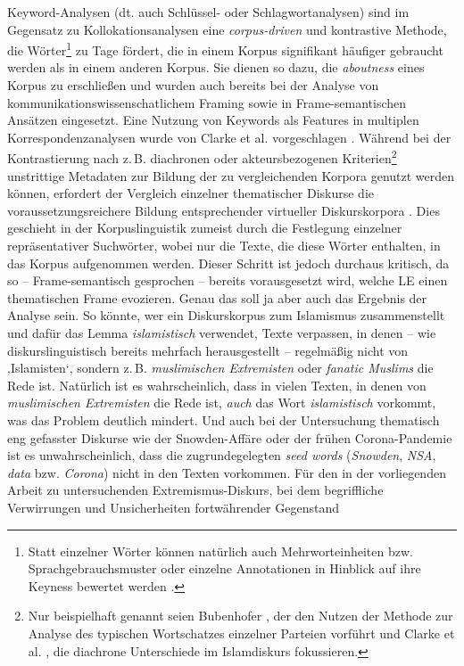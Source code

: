 Keyword-Analysen (dt. auch Schlüssel- oder Schlagwortanalysen) sind im Gegensatz zu Kollokationsanalysen eine \emph{corpus-driven} und kontrastive Methode, die Wörter\footnote{Statt einzelner Wörter können natürlich auch Mehrworteinheiten bzw. Sprachgebrauchsmuster oder einzelne Annotationen in Hinblick auf ihre Keyness bewertet werden \autocite{bubenhoferSprachgebrauchsmusterKorpuslinguistikAls2009, bubenhofer4KollokationenNGramme2017}.} zu Tage fördert, die in einem Korpus signifikant häufiger gebraucht werden als in einem anderen Korpus. Sie dienen so dazu, die \emph{aboutness} eines Korpus zu erschließen \autocite{gabrielatosKeynessAnalysisNature2018} und wurden auch bereits bei der Analyse von kommunikationswissenschatlichem Framing \autocite{bakerChangingFramesObesity2020} sowie in Frame-semantischen Ansätzen \autocite{ziemMedienFramesAlsSemantische2018} eingesetzt. Eine Nutzung von Keywords als Features in multiplen Korrespondenzanalysen wurde von Clarke et al. vorgeschlagen \autocite{clarkeMultipleCorrespondenceAnalysis2021, clarkeKeywordsTimeTracking2022}. Während bei der Kontrastierung nach z.\,B. diachronen oder akteursbezogenen Kriterien\footnote{Nur beispielhaft genannt seien Bubenhofer \autocite*{bubenhofer4KollokationenNGramme2017}, der den Nutzen der Methode zur Analyse des typischen Wortschatzes einzelner Parteien vorführt und Clarke et al. \autocite*{clarkeKeywordsTimeTracking2022}, die diachrone Unterschiede im Islamdiskurs fokussieren.} unstrittige Metadaten zur Bildung der zu vergleichenden Korpora genutzt werden können, erfordert der Vergleich einzelner thematischer Diskurse die voraussetzungsreichere Bildung entsprechender virtueller Diskurskorpora \autocite{busseIstDiskursSprachwissenschaftliches1994}. Dies geschieht in der Korpuslinguistik zumeist durch die Festlegung einzelner repräsentativer Suchwörter, wobei nur die Texte, die diese Wörter enthalten, in das Korpus aufgenommen werden. Dieser Schritt ist jedoch durchaus kritisch, da so -- Frame-semantisch gesprochen -- bereits vorausgesetzt wird, welche LE einen thematischen Frame evozieren. Genau das soll ja aber auch das Ergebnis der Analyse sein. So könnte, wer ein Diskurskorpus zum Islamismus zusammenstellt und dafür das Lemma \emph{islamistisch} verwendet, Texte verpassen, in denen -- wie diskurslinguistisch bereits mehrfach herausgestellt -- regelmäßig nicht von ‚Islamisten`, sondern z.\,B. \emph{muslimischen Extremisten} \autocite[116, Tabelle 23]{kalwaKonzeptIslamDiskurslinguistische2013} oder \emph{fanatic Muslims} \autocite[249, Table 1]{bakerAcceptableBiasUsing2012} die Rede ist. Natürlich ist es wahrscheinlich, dass in vielen Texten, in denen von \emph{muslimischen Extremisten} die Rede ist, \emph{auch} das Wort \emph{islamistisch} vorkommt, was das Problem deutlich mindert. Und auch bei der Untersuchung thematisch eng gefasster Diskurse wie der Snowden-Affäre \autocite{ziemMedienFramesAlsSemantische2018} oder der frühen Corona-Pandemie \autocite{bubenhoferGrenzenUndWelten2020} ist es unwahrscheinlich, dass die zugrundegelegten \emph{seed words} (\emph{Snowden}, \emph{NSA}, \emph{data} bzw. \emph{Corona}) nicht in den Texten vorkommen. Für den in der vorliegenden Arbeit zu untersuchenden Extremismus-Diskurs, bei dem begriffliche Verwirrungen und Unsicherheiten fortwährender Gegenstand 